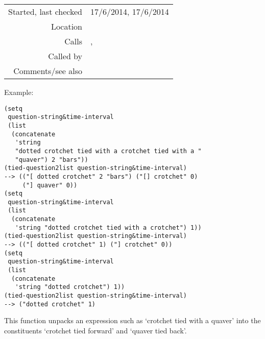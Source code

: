 \vspace{0.3cm}
\begin{tabular}{r|p{8cm}}
Started, last checked & 17/6/2014, 17/6/2014 \\
Location & \nameref{sec:analytic-string-manipulations} \\
Calls & \nameref{fun:my-last}, \nameref{fun:string-separated-string2list} \\
Called by & \nameref{fun:followed-by-splitter} \\
Comments/see also &
\end{tabular}

\vspace{0.5cm}
\noindent Example:
\begin{verbatim}
(setq
 question-string&time-interval
 (list
  (concatenate
   'string
   "dotted crotchet tied with a crotchet tied with a "
   "quaver") 2 "bars"))
(tied-question2list question-string&time-interval)
--> (("[ dotted crotchet" 2 "bars") ("[] crotchet" 0)
     ("] quaver" 0))
(setq
 question-string&time-interval
 (list
  (concatenate
   'string "dotted crotchet tied with a crotchet") 1))
(tied-question2list question-string&time-interval)
--> (("[ dotted crotchet" 1) ("] crotchet" 0))
(setq
 question-string&time-interval
 (list
  (concatenate
   'string "dotted crotchet") 1))
(tied-question2list question-string&time-interval)
--> ("dotted crotchet" 1)
\end{verbatim}

\noindent This function unpacks an expression such as
`crotchet tied with a quaver' into the constituents
`crotchet tied forward' and `quaver tied back'.

